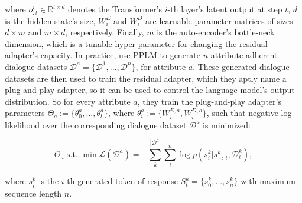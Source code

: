 where $o_{:t}^i \in \mathbb{R}^{t \times d}$ denotes the Transformer's $i$-th layer's latent output at step $t$, $d$ is the hidden state's size, $W_i^E$ and $W_i^D$ are learnable parameter-matrices of sizes $d \times m$ and $m \times d$, respectively. Finally, $m$ is the auto-encoder's bottle-neck dimension, which is a tunable hyper-parameter for changing the residual adapter's capacity. In practice, \cite{madotto-etal-2020-plug} use PPLM to generate $n$ attribute-adherent dialogue datasets $\mathscr{D}^a = \{\mathcal{D}^1, ..., \mathcal{D}^n\}$, for attribute $a$. These generated dialogue datasets are then used to train the residual adapter, which they aptly name a plug-and-play adapter, so it can be used to control the language model's output distribution. So for every attribute $a$, they train the plug-and-play adapter's parameters $\Theta_a := \{\theta^{a}_0, ..., \theta^{a}_l\}$, where $\theta^{a}_i := \{W_i^{E, a},W_i^{D, a}\}$, such that negative log-likelihood over the corresponding dialogue dataset $\mathscr{D}^a$ is minimized:

\begin{equation}
    \Theta_a \text{ s.t. } 
    \min \mathcal{L} (\mathscr{D}^a) = - \sum_{k}^{|\mathscr{D}^a|} \sum_{i}^n 
    \log p(s_i^k | s_{<i}^k, \mathcal{D}^k_t),
\end{equation}

where $s_i^k$ is the $i$-th generated token of response $S_t^k = \{s_0^k, ..., s_n^k\}$ with maximum sequence length $n$.


